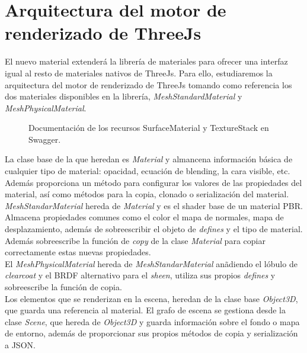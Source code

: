 \section{Arquitectura del motor de renderizado de ThreeJs}
El nuevo material extender\'a la librer\'ia de materiales para ofrecer una interfaz igual al resto de materiales nativos
de ThreeJs. Para ello, estudiaremos la arquitectura del motor de renderizado de ThreeJs tomando como referencia los dos
materiales disponibles en la librer\'ia, \textit{MeshStandardMaterial} y \textit{MeshPhysicalMaterial}.

\begin{figure}[H]
  \centering
  \caption{Documentaci\'on de los recursos SurfaceMaterial y TextureStack en Swagger.}
  \vspace{0.5cm}
\end{figure}

La clase base de la que heredan es \textit{Material} y almancena informaci\'on b\'asica de
cualquier tipo de material: opacidad, ecuaci\'on de blending, la cara visible, etc. Adem\'as proporciona un m\'etodo
para configurar los valores de las propiedades del material, as\'i como m\'etodos para la copia, clonado o serializaci\'on
del material.\\

\textit{MeshStandarMaterial} hereda de \textit{Material} y es el shader base de un material PBR. Almacena propiedades comunes
como el color el mapa de normales, mapa de desplazamiento, adem\'as de sobreescribir el objeto de \textit{defines} y el tipo
de material. Adem\'as sobreescribe la funci\'on de \textit{copy} de la clase \textit{Material} para copiar correctamente
estas nuevas propiedades.\\

El \textit{MeshPhysicalMaterial} hereda de \textit{MeshStandarMaterial} an\~adiendo el l\'obulo de \textit{clearcoat} y
el BRDF alternativo para el \textit{sheen}, utiliza sus propios \textit{defines} y sobreescribe la funci\'on de copia.\\

Los elementos que se renderizan en la escena, heredan de la clase base \textit{Object3D}, que guarda una referencia
al material. El grafo de escena se gestiona desde la clase \textit{Scene}, que hereda de \textit{Object3D} y guarda
informaci\'on sobre el fondo o mapa de entorno, adem\'as de proporcionar sus propios m\'etodos de copia y serializaci\'on
a JSON.

